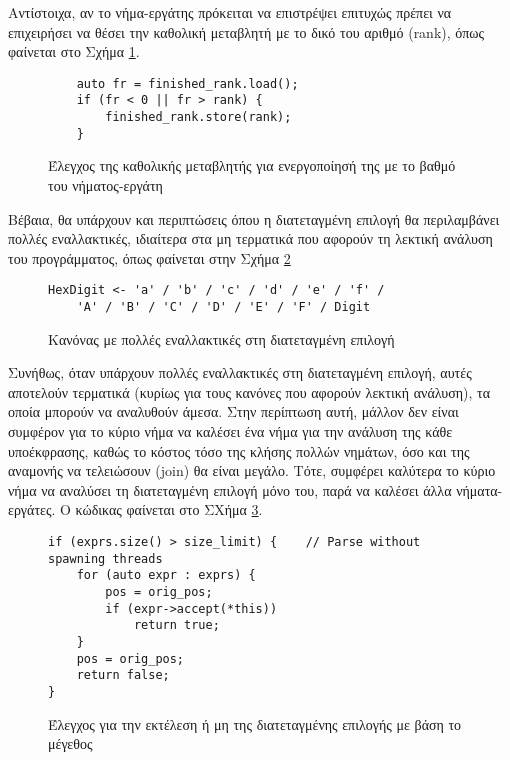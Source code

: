 Αντίστοιχα, αν το νήμα-εργάτης πρόκειται να επιστρέψει επιτυχώς πρέπει να επιχειρήσει να θέσει την καθολική μεταβλητή με το δικό του αριθμό (rank), όπως φαίνεται στο Σχήμα \ref{fig:top_down_3}.

\begin{figure}[h]
\setlength\partopsep{-\topsep}%
\begin{verbatim}
    auto fr = finished_rank.load();
    if (fr < 0 || fr > rank) { 
        finished_rank.store(rank);
    }
\end{verbatim}
\caption{Έλεγχος της καθολικής μεταβλητής για ενεργοποίησή της με το βαθμό του νήματος-εργάτη}
\label{fig:top_down_3}
\end{figure}


Βέβαια, θα υπάρχουν και περιπτώσεις όπου η διατεταγμένη επιλογή θα περιλαμβάνει πολλές εναλλακτικές, ιδιαίτερα στα μη τερματικά που αφορούν τη λεκτική ανάλυση του προγράμματος, όπως φαίνεται στην Σχήμα \ref{fig:top_down_4}

\begin{figure}[h]
\begin{Verbatim}
HexDigit <- 'a' / 'b' / 'c' / 'd' / 'e' / 'f' / 
    'A' / 'B' / 'C' / 'D' / 'E' / 'F' / Digit
\end{Verbatim}
\caption{Κανόνας με πολλές εναλλακτικές στη διατεταγμένη επιλογή}
\label{fig:top_down_4}
\end{figure}


Συνήθως, όταν υπάρχουν πολλές εναλλακτικές στη διατεταγμένη επιλογή, αυτές αποτελούν τερματικά (κυρίως για τους κανόνες που αφορούν λεκτική ανάλυση), τα οποία μπορούν να αναλυθούν άμεσα. 
Στην περίπτωση αυτή, μάλλον δεν είναι συμφέρον για το κύριο νήμα να καλέσει ένα νήμα για την ανάλυση της κάθε υποέκφρασης, καθώς το κόστος τόσο της κλήσης πολλών νημάτων, όσο και της αναμονής να τελειώσουν (join) θα είναι μεγάλο.
Τότε, συμφέρει καλύτερα το κύριο νήμα να αναλύσει τη διατεταγμένη επιλογή μόνο του, παρά να καλέσει άλλα νήματα-εργάτες. 
Ο κώδικας φαίνεται στο ΣΧήμα \ref{fig:expr_size}.

\begin{figure}[h]
\setlength\partopsep{-\topsep}%
\begin{verbatim}
if (exprs.size() > size_limit) {    // Parse without spawning threads
    for (auto expr : exprs) {
        pos = orig_pos;
        if (expr->accept(*this))
            return true;
    }
    pos = orig_pos;
    return false;
}
\end{verbatim}
\caption{Έλεγχος για την εκτέλεση ή μη της διατεταγμένης επιλογής με βάση το μέγεθος}
\label{fig:expr_size}
\end{figure}

